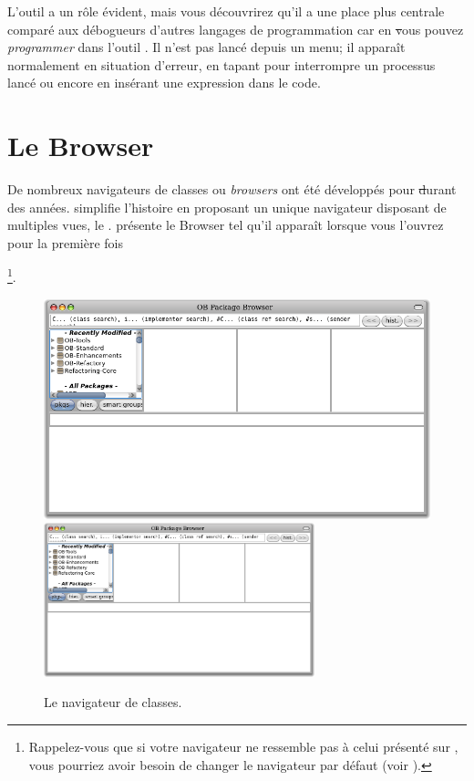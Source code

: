\documentclass[a4paper,10pt,twoside]{book}
\begin{document}
L'outil  a un rôle évident, mais vous découvrirez qu'il a une place plus centrale comparé aux débogueurs d'autres langages de programmation
car en \st vous pouvez \emph{programmer} dans l'outil .  Il n'est pas lancé depuis un menu; il apparaît normalement en situation d'erreur,
en tapant  pour interrompre un processus lancé ou
encore en insérant une expression  dans le code.


\section{Le Browser} %

De nombreux navigateurs de classes ou \emph{browsers} ont été
développés pour \st durant des années. \pharo simplifie l'histoire
en proposant un unique navigateur disposant de multiples vues,
le . 
 présente le Browser tel qu'il apparaît
lorsque vous l'ouvrez pour la première fois

\footnote{Rappelez-vous que si votre navigateur ne ressemble pas à 
celui présenté sur , vous pourriez avoir besoin 
de changer le navigateur par défaut (voir ).}.

\begin{figure}[htbp]
   \centering
   \ifluluelse
	 {\includegraphics[width=\textwidth]{SystemBrowser0} }
	 {\includegraphics[width=0.7\textwidth]{SystemBrowser0} }
   \caption{Le navigateur de classes.}
\end{figure}
\end{document}
